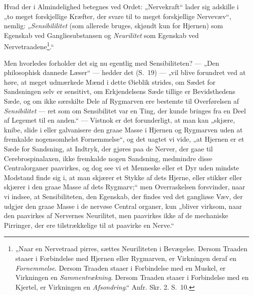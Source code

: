 \documentclass[11pt]{book}
\newcommand{\opage}[1]{\marginnote{\footnotesize\textit{[#1]}}}
\begin{document}
\opage{366} \setcounter{footnote}{0}%
Hvad der i Almindelighed betegnes ved Ordet: „Nervekraft“ lader sig
adskille i „to meget forskjellige Kræfter, der svare til to meget
forskjellige Nervevæv“, nemlig: „\emph{Sensibililitet} (som allerede
bruges, skjøndt kun for Hjernen) som Egenskab ved Gangliesubstansen og
\emph{Neurilitet} som Egenskab ved
Nervetraadene\footnote{%
„Naar en Nervetraad pirres, sættes Neuriliteten i Bevægelse. Dersom
Traaden staaer i Forbindelse med Hjernen eller Rygmarven, er
Virkningen deraf en \emph{Fornemmelse}. Dersom Traaden staaer i
Forbindelse med en Muskel, er Virkningen en \emph{Sammentrækning}.
Dersom Traaden staaer i Forbindelse med en Kjertel, er Virkningen en
\emph{Afsondring}.“ Anfr. Skr. 2. S.~10.
}.“

Men hvorledes forholder det sig nu egentlig med Sensibiliteten? ---
„Den philosophisk dannede Læser“ --- hedder det (S.~19) --- „vil blive
forundret ved at høre, at meget udmærkede Mænd i dette Øieblik
strides, om Sædet for Sandsningen selv er sensitivt, om Erkjendelsens
Sæde tillige er Bevidsthedens Sæde, og om ikke særskilte Dele af
Rygmarven ere bestemte til Overførelsen af \emph{Sensibilitet} --- ret
som om Sensibilitet var en Ting, der kunde bringes fra en Deel af
Legemet til en anden.“ --- Vistnok er det forunderligt, at man kan
„skjære, knibe, slide i eller galvanisere den graae Masse i Hjernen og
Rygmarven uden at fremkalde nogensomhelst Fornemmelse“, og det uagtet
vi vide, „at Hjernen er et Sæde for Sandsning, at Indtryk, der gjøres
paa de Nerver, der gaae til Cerebrospinalaxen, ikke fremkalde nogen
Sandsning, medmindre disse Centralorganer paavirkes, og dog see vi et
Menneske eller et Dyr uden mindste Modstand finde sig i, at man
skjærer et Stykke af dets Hjerne, eller stikker eller skjærer i den
graae Masse af dets Rygmarv;“ men Overraskelsen forsvinder, naar vi
indsee, at Sensibiliteten, den Egenskab, der findes ved det gangliøse
Væv, der udgjør den graae Masse i de nervøse Central\-%
\opage{367} \setcounter{footnote}{0}%
organer, kun „bliver virksom, naar den paavirkes af Nervernes
Neurilitet, men paavirkes ikke af de mechaniske Pirringer, der ere
tilstrækkelige til at paavirke en Nerve.“
\end{document}
